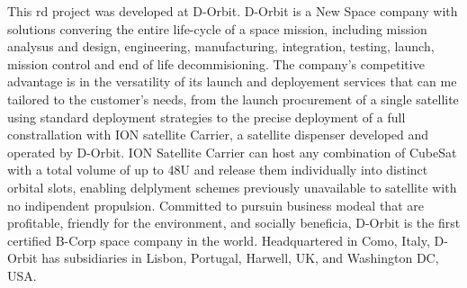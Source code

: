 This \acrshort{rd} project was developed at D-Orbit.
D-Orbit is a New Space company with solutions convering the entire life-cycle of a space mission, including mission analysus and design, engineering, manufacturing, integration, testing, launch, mission control and end of life decommisioning.
The company's competitive advantage is in the versatility of its launch and deployement services that can me tailored to the customer's needs, from the launch procurement of a single satellite using standard deployment strategies to the precise deployment of a full constrallation with ION satellite Carrier, a satellite dispenser developed and operated by D-Orbit.
ION Satellite Carrier can host any combination of CubeSat with a total volume of up to 48U and release them individually into distinct orbital slots, enabling delplyment schemes previously unavailable to satellite with no indipendent propulsion.
Committed to pursuin business modeal that are profitable, friendly for the environment, and socially beneficia, D-Orbit is the first certified B-Corp space company in the world.
Headquartered in Como, Italy, D-Orbit has subsidiaries in Lisbon, Portugal, Harwell, UK, and Washington DC, USA.

